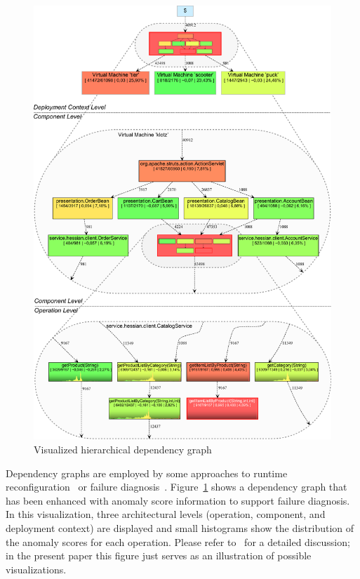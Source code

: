 \begin{figure}\centering
\includegraphics[width=\columnwidth]{figures/visualization-01}%
\caption{Visualized hierarchical dependency graph~\citep{MarwedeRohrHoornHasselbring2009AutomaticFailureDiagnosisInDistributedLargeScaleSoftwareSystemsBasedOnTimingBehaviorAnomalyCorrelation}}
\label{fig:hierarchicalDependecyGraph}
\end{figure}

Dependency graphs are employed by some approaches to runtime reconfiguration~\citep{SEAA07} or failure %
diagnosis~\citep{MarwedeRohrHoornHasselbring2009AutomaticFailureDiagnosisInDistributedLargeScaleSoftwareSystemsBasedOnTimingBehaviorAnomalyCorrelation}.
Figure~\ref{fig:hierarchicalDependecyGraph} shows a dependency graph that has been enhanced with anomaly score information to support failure diagnosis. %
In this visualization, three architectural levels (operation, component, and deployment context) are displayed and small histograms
show the distribution of the anomaly scores for each operation. Please refer to~%
\citep{MarwedeRohrHoornHasselbring2009AutomaticFailureDiagnosisInDistributedLargeScaleSoftwareSystemsBasedOnTimingBehaviorAnomalyCorrelation} for a detailed discussion; in the present paper this figure just serves as an illustration of possible visualizations.

